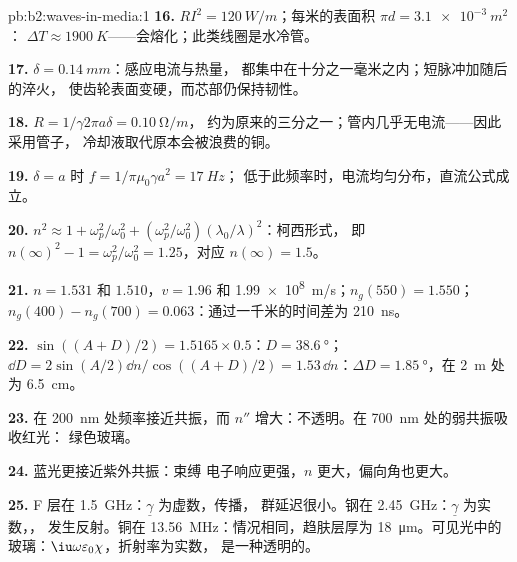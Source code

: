 \begin{solution}{pb:b2:waves-in-media:1}
\textbf{16.} $RI^2 = \qty{120}{W/m}$；每米的表面积 $\pi d = \qty{3.1e-3}{m^2}$：
$\Delta T \approx \qty{1900}{K}$——会熔化；此类线圈是水冷管。

\textbf{17.} $\delta = \qty{0.14}{mm}$：感应电流与热量，
都集中在十分之一毫米之内；短脉冲加随后的淬火，
使齿轮表面变硬，而芯部仍保持韧性。

\textbf{18.} $R = 1/\gamma2\pi a\delta = \qty{0.10}{\ohm/m}$，
约为原来的三分之一；管内几乎无电流——因此采用管子，
冷却液取代原本会被浪费的铜。

\textbf{19.} $\delta = a$ 时 $f = 1/\pi\mu_0\gamma a^2 = \qty{17}{Hz}$；
低于此频率时，电流均匀分布，直流公式成立。

\textbf{20.} $n^2 \approx 1 + \omega_p^2/\omega_0^2 + (\omega_p^2/\omega_0^2)(\lambda_0/\lambda)^2$：柯西形式，
即 $n(\infty)^2 - 1 = \omega_p^2/\omega_0^2 = 1.25$，对应 $n(\infty) = 1.5$。

\textbf{21.} $n = 1.531$ 和 $1.510$，$v = 1.96$ 和 \qty{1.99e8}{m/s}；$n_g(550) =
1.550$；$n_g(400) - n_g(700) = 0.063$：通过一千米的时间差为 \qty{210}{ns}。

\textbf{22.} $\sin((A + D)/2) = 1.5165 \times 0.5$：$D = \qty{38.6}{\degree}$；$\dd D = 2\sin
(A/2)\dd n/\cos((A + D)/2) = 1.53\,\dd n$：$\Delta D = \qty{1.85}{\degree}$，在 \qty{2}{m} 处为 \qty{6.5}{cm}。

\textbf{23.} 在 \qty{200}{nm} 处频率接近共振，而
$n''$ 增大：不透明。在 \qty{700}{nm} 处的弱共振吸收红光：
绿色玻璃。

\textbf{24.} 蓝光更接近紫外共振：束缚
电子响应更强，$n$ 更大，偏向角也更大。

\textbf{25.} F 层在 \qty{1.5}{GHz}：$\underline\gamma$ 为虚数，传播，
群延迟很小。钢在 \qty{2.45}{GHz}：$\underline\gamma$ 为实数，，
发生反射。铜在 \qty{13.56}{MHz}：情况相同，趋肤层厚为
\qty{18}{\micro m}。可见光中的玻璃：$\iu\omega\varepsilon_0\chi$，折射率为实数，
是一种透明的。
\end{solution}
